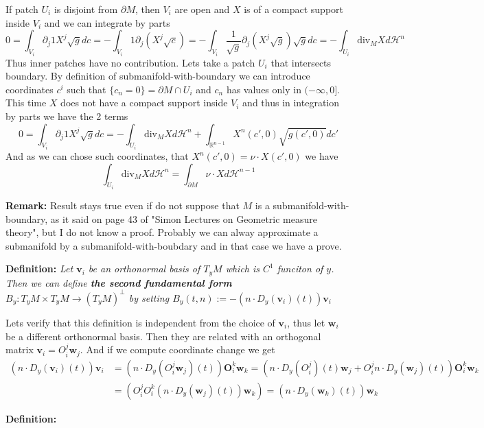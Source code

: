 \vspace{1ex}
If patch $U_i$ is disjoint from $\partial M$, then $V_i$ are open and $X$ is of
a compact support inside $V_i$ and we can integrate by parts
\[0=\int_{V_i}\partial_j 1X^j\sqrt gdc=-\int_{V_i}1\partial_j(X^j\sqrt c)=
-\int_{V_i}\frac{1}{\sqrt g}\partial_j(X^j\sqrt g)\sqrt gdc=-\int_{U_i}\text{div}_M Xd\mathcal H^n\]
Thus inner patches have no contribution. Lets take a patch $U_i$ that intersects
boundary. By definition of submanifold-with-boundary we can introduce coordinates
$c^i$ such that $\{c_n=0\}=\partial M\cap U_i$ and $c_n$ has values only in
$(-\infty,0]$. This time $X$ does not have a compact support inside $V_i$ and
thus in integration by parts we have the 2 terms
\[0=\int_{V_i}\partial_j 1X^j\sqrt gdc=-\int_{U_i}\text{div}_M Xd\mathcal H^n+\int_{\mathbb R^{n-1}}X^n(c',0)\sqrt{g(c',0)}dc'\]
And as we can chose such coordinates, that $X^n(c',0)=\nu\cdot X(c',0)$ we have
\[\int_{U_i}\text{div}_M Xd\mathcal H^n=\int_{\partial M}\nu\cdot Xd\mathcal H^{n-1}\]

\vspace{2ex}
\textbf{Remark:} Result stays true even if do not suppose that $M$ is a
submanifold-with-boundary, as it said on page 43 of "Simon Lectures on
Geometric measure theory", but I do not know a proof. Probably we can alway
approximate a submanifold by a submanifold-with-boubdary and in that case
we have a prove.

\vspace{2ex}
\textbf{Definition:} \textit{Let $\mathbf{v}_i$ be an orthonormal basis of $T_yM$ which
is $C^1$ funciton of $y$. Then we can define \textbf{the second fundamental form}
$B_y:T_yM\times T_yM\rightarrow (T_yM)^\perp$ by setting $B_y(t,n):=-(n\cdot D_y
(\mathbf v_i)(t))\mathbf v_i$
}

\vspace{2ex} Lets verify that this definition is independent from the choice of
$\mathbf v_i$, thus let $\mathbf w_i$ be a different orthonormal basis. Then
they are related with an orthogonal matrix $\mathbf v_i=O_i^j\mathbf w_j$. And
if we compute coordinate change we get
\begin{align*}
    (n\cdot D_y(\mathbf v_i)(t))\mathbf v_i&=(n\cdot D_y(O_i^j\mathbf w_j)(t))\mathbf O_i^k\mathbf w_k
=(n\cdot D_y(O_i^j)(t)\mathbf w_j + O_i^j n\cdot D_y(\mathbf w_j)(t))\mathbf O_i^k\mathbf w_k\\
    &=(O_i^jO_i^k(n\cdot D_y(\mathbf w_j)(t))\mathbf w_k)=(n\cdot D_y(\mathbf w_k)(t))\mathbf w_k
\end{align*}

\vspace{2ex}
\textbf{Definition:}
